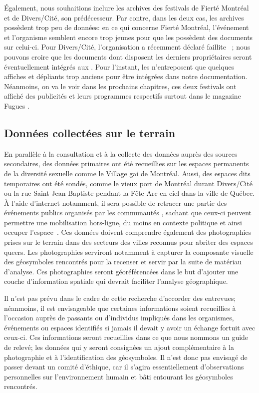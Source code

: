Également, nous souhaitions inclure les archives des festivals de Fierté Montréal et de Divers/Cité, son prédécesseur. 
Par contre, dans les deux cas, les archives possèdent trop peu de données: en ce qui concerne Fierté Montréal, l'événement et l'organisme semblent encore trop jeunes pour que les \agq{} possèdent des documents sur celui-ci. 
Pour Divers/Cité, l'organisation a récemment déclaré faillite~\citep{Cormier2015} ; nous pouvons croire que les documents dont disposent les derniers propriétaires seront éventuellement intégrés aux \agq{}. 
Pour l'instant, les \agq{} n'entreposent que quelques affiches et dépliants trop anciens pour être intégrées dans notre documentation. 
Néanmoins, on va le voir dans les prochains chapitres, ces deux festivals ont affiché des publicités et leurs programmes respectifs surtout dans le magazine Fugues .

\subsection{Données collectées sur le terrain}
\label{sub:donnees_collectees_sur_le_terrain}
En parallèle à la consultation et à la collecte des données auprès des sources secondaires, des données primaires ont été recueillies sur les espaces permanents de la diversité sexuelle comme le Village gai de Montréal. 
Aussi, des espaces dits temporaires ont été sondés, comme le vieux port de Montréal durant Divers/Cité ou la rue Saint-Jean-Baptiste pendant la Fête Arc-en-ciel dans la ville de Québec. 
À l'aide d'internet notamment, il sera possible de retracer une partie des événements publics organisés par les communautés \lgbt{}, sachant que ceux-ci peuvent permettre une mobilisation hors-ligne, du moins en contexte politique et ainsi occuper l'espace~\citep[153-154]{Mercea2011}. 
Ces données doivent comprendre également des photographies prises sur le terrain dans des secteurs des villes reconnus pour abriter des espaces queers. 
Les photographies serviront notamment à capturer la composante visuelle des géosymboles rencontrés pour la recenser et servir par la suite de matériau d'analyse. 
Ces photographies seront géoréférencées dans le but d'ajouter une couche d'information spatiale qui devrait faciliter l'analyse géographique.

Il n'est pas prévu dans le cadre de cette recherche d'accorder des entrevues; néanmoins, il est envisageable que certaines informations soient recueillies à l'occasion auprès de passants ou d'individus impliqués dans les organismes, événements ou espaces identifiés si jamais il devait y avoir un échange fortuit avec ceux-ci. 
Ces informations seront recueillies dans ce que nous nommons un guide de relevé; les données qui y seront consignées un ajout complémentaire à la photographie et à l'identification des géosymboles. 
Il n'est donc pas envisagé de passer devant un comité d'éthique, car il s'agira essentiellement d'observations personnelles sur l'environnement humain et bâti entourant les géosymboles rencontrés.

